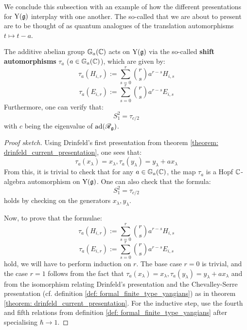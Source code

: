             We conclude this subsection with an example of how the different presentations for $\mathrm{Y}(\mathfrak{g})$ interplay with one another. The so-called  that we are about to present are to be thought of as quantum analogues of the translation automorphisms $t \mapsto t - a$.
            \begin{proposition} \label{prop: finite_type_yangians_shift_automorphisms}
                \cite[Proposition 12.1.5]{chari_pressley_quantum_groups} The additive abelian group $\mathbb{G}_a(\mathbb{C})$ acts on $\mathrm{Y}(\mathfrak{g})$ via the so-called \textbf{shift automorphisms} $\tau_a$ ($a \in \mathbb{G}_a(\mathbb{C})$), which are given by:
                    $$\tau_a(H_{i, r}) := \sum_{s = 0}^r \binom{r}{s} a^{r - s} H_{i, s}$$
                    $$\tau_a(E_{i, r}) := \sum_{s = 0}^r \binom{r}{s} a^{r - s} E_{i, s}$$
                Furthermore, one can verify that:
                    $$S_1^2 = \tau_{c/2}$$
                with $c$ being the eigenvalue of $\mathrm{ad}(\mathscr{R}_{\mathfrak{g}})$.
            \end{proposition}
                \begin{proof}[Proof sketch]
                    Using Drinfeld's first presentation from theorem \ref{theorem: drinfeld_current_presentation}, one sees that:
                        $$\tau_a(x_{\lambda}) = x_{\lambda}, \tau_a(y_{\lambda}) = y_{\lambda} + a x_{\lambda}$$
                    From this, it is trivial to check that for any $a \in \mathbb{G}_a(\mathbb{C})$, the map $\tau_a$ is a Hopf $\mathbb{C}$-algebra automorphism on $\mathrm{Y}(\mathfrak{g})$. One can also check that the formula:
                        $$S_1^2 = \tau_{c/2}$$
                    holds by checking on the generators $x_{\lambda}, y_{\lambda}$. 

                    Now, to prove that the formulae:
                        $$\tau_a(H_{i, r}) := \sum_{s = 0}^r \binom{r}{s} a^{r - s} H_{i, s}$$
                        $$\tau_a(E_{i, r}) := \sum_{s = 0}^r \binom{r}{s} a^{r - s} E_{i, s}$$
                    hold, we will have to perform induction on $r$. The base case $r = 0$ is trivial, and the case $r = 1$ follows from the fact that $\tau_a(x_{\lambda}) = x_{\lambda}, \tau_a(y_{\lambda}) = y_{\lambda} + a x_{\lambda}$ and from the isomorphism relating Drinfeld's presentation and the Chevalley-Serre presentation (cf. definition \ref{def: formal_finite_type_yangians}) as in theorem \ref{theorem: drinfeld_current_presentation}. For the inductive step, use the fourth and fifth relations from definition \ref{def: formal_finite_type_yangians} after specialising $\hbar \to 1$. 
                \end{proof}

